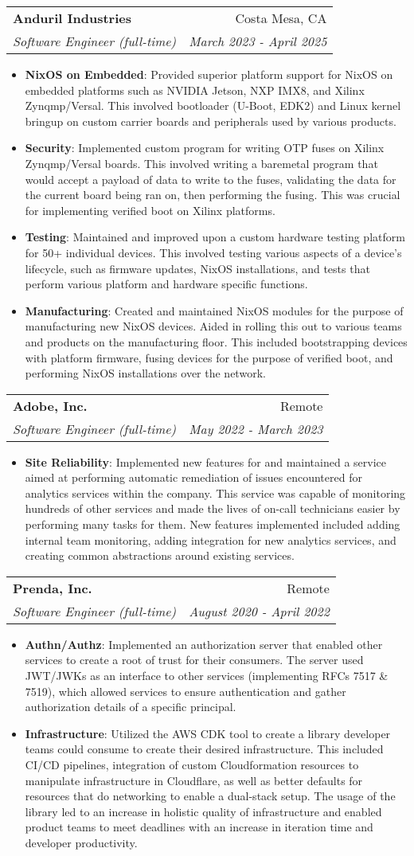 \documentclass[a4paper,20pt]{article}
\makeatletter
\newcommand{\resumeItem}[2]{\item\small{\textbf{#1}{: #2 \vspace{-2pt}}}}
\newcommand{\resumeSubheading}[4]{
	\vspace{-1pt}\item
	\begin{tabular*}{0.97\textwidth}{l@{\extracolsep{\fill}}r}
		\textbf{#1} & #2 \\
		\textit{#3} & \textit{#4} \\
	\end{tabular*}\vspace{-5pt}
}
\newcommand{\resumeItemListStart}{\begin{itemize}}
\newcommand{\resumeItemListEnd}{\end{itemize}\vspace{-5pt}}
\makeatother
\begin{document}
\resumeSubheading{Anduril Industries}{Costa Mesa, CA}
{Software Engineer (full-time)}{March 2023 - April 2025}
\resumeItemListStart
\resumeItem{NixOS on Embedded}{Provided superior platform support for NixOS on
embedded platforms such as NVIDIA Jetson, NXP IMX8, and Xilinx Zynqmp/Versal.
This involved bootloader (U-Boot, EDK2) and Linux kernel bringup on custom
carrier boards and peripherals used by various products.}
\resumeItem{Security}{Implemented custom program for writing OTP fuses on
Xilinx Zynqmp/Versal boards. This involved writing a baremetal program that
would accept a payload of data to write to the fuses, validating the data for
the current board being ran on, then performing the fusing. This was crucial
for implementing verified boot on Xilinx platforms.}
\resumeItem{Testing}{Maintained and improved upon a custom hardware testing
platform for 50+ individual devices. This involved testing various aspects of a
device's lifecycle, such as firmware updates, NixOS installations, and tests
that perform various platform and hardware specific functions.}
\resumeItem{Manufacturing}{Created and maintained NixOS modules for the purpose
of manufacturing new NixOS devices. Aided in rolling this out to various teams
and products on the manufacturing floor. This included bootstrapping devices
with platform firmware, fusing devices for the purpose of verified boot, and
performing NixOS installations over the network.}
\resumeItemListEnd

\resumeSubheading{Adobe, Inc.}{Remote}
{Software Engineer (full-time)}{May 2022 - March 2023}
\resumeItemListStart
\resumeItem{Site Reliability}{Implemented new features for and maintained a
service aimed at performing automatic remediation of issues encountered for
analytics services within the company. This service was capable of monitoring
hundreds of other services and made the lives of on-call technicians easier by
performing many tasks for them. New features implemented included adding
internal team monitoring, adding integration for new analytics services, and
creating common abstractions around existing services.}
\resumeItemListEnd

\resumeSubheading{Prenda, Inc.}{Remote}
{Software Engineer (full-time)}{August 2020 - April 2022}
\resumeItemListStart
\resumeItem{Authn/Authz}{Implemented an authorization server that enabled other
services to create a root of trust for their consumers. The server used
JWT/JWKs as an interface to other services (implementing RFCs 7517 \& 7519),
which allowed services to ensure authentication and gather authorization
details of a specific principal.}
\resumeItem{Infrastructure}{Utilized the AWS CDK tool to create a library
developer teams could consume to create their desired infrastructure. This
included CI/CD pipelines, integration of custom Cloudformation resources to
manipulate infrastructure in Cloudflare, as well as better defaults for
resources that do networking to enable a dual-stack setup. The usage of the
library led to an increase in holistic quality of infrastructure and enabled
product teams to meet deadlines with an increase in iteration time and
developer productivity.}
\resumeItemListEnd
\end{document}
